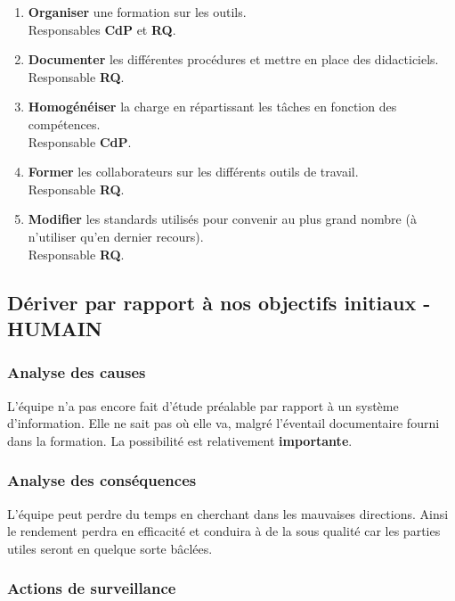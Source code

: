 \documentclass[twoside]{article}
\begin{document}
\begin{enumerate}
\item {\bf Organiser} une formation sur les outils.\\
Responsables {\bf CdP} et {\bf RQ}.
\item {\bf Documenter} les différentes procédures et mettre en place des
didacticiels.\\
Responsable {\bf RQ}.
\item {\bf Homogénéiser} la charge en répartissant les tâches en fonction
des compétences. \\
Responsable {\bf CdP}.
\item {\bf Former} les collaborateurs sur les différents outils de travail. \\
Responsable {\bf RQ}.
\item {\bf Modifier} les standards utilisés pour convenir au plus grand nombre
(à n'utiliser qu'en dernier recours). \\Responsable {\bf RQ}.
\end{enumerate}

\subsection{Dériver par rapport à nos objectifs initiaux - HUMAIN}
\subsubsection{Analyse des causes}

L'équipe n'a pas encore fait d'étude préalable par rapport à un système
d'information. Elle ne sait pas où elle va, malgré l'éventail documentaire
fourni dans la formation. 
La possibilité est relativement {\bf importante}.

\subsubsection{Analyse des conséquences}

L'équipe peut perdre du temps en cherchant dans les mauvaises directions.
Ainsi le rendement perdra en efficacité et conduira à de la sous qualité car
les parties utiles seront en quelque sorte bâclées. 

\subsubsection{Actions de surveillance}
\end{document}
